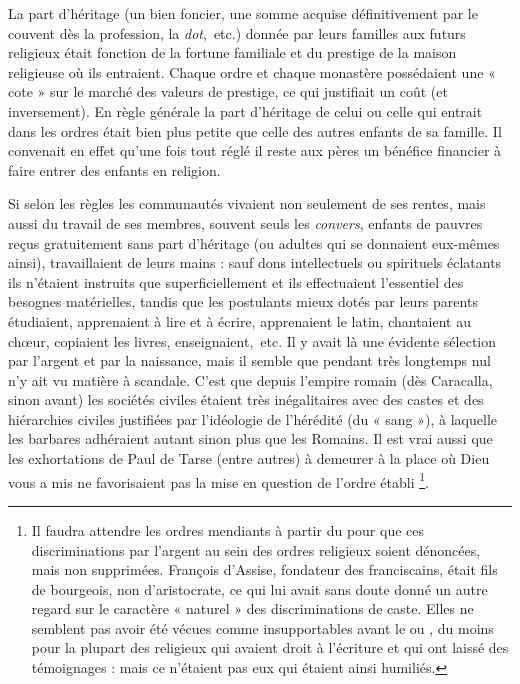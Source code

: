  La part d'héritage (un bien foncier, une somme acquise définitivement par le couvent dès la profession, la \emph{dot},~etc.) donnée par leurs familles aux futurs religieux était fonction de la fortune familiale et du prestige de la maison religieuse où ils entraient. Chaque ordre et chaque monastère possédaient une « cote » sur le marché des valeurs de prestige, ce qui justifiait un coût (et inversement). En règle générale la part d'héritage de celui ou celle qui entrait dans les ordres était bien plus petite que celle des autres enfants de sa famille. Il convenait en effet qu'une fois tout réglé il reste aux pères un bénéfice financier à faire entrer des enfants en religion. 

 Si selon les règles les communautés vivaient non seulement de ses rentes, mais aussi du travail de ses membres, souvent seuls les \emph{convers}, enfants de pauvres reçus gratuitement sans part d'héritage (ou adultes qui se donnaient eux-mêmes ainsi), travaillaient de leurs mains : sauf dons intellectuels ou spirituels éclatants ils n'étaient instruits que superficiellement et ils effectuaient l'essentiel des besognes matérielles, tandis que les postulants mieux dotés par leurs parents étudiaient, apprenaient à lire et à écrire, apprenaient le latin, chantaient au chœur, copiaient les livres, enseignaient,~etc. Il y avait là une évidente sélection par l'argent et par la naissance, mais il semble que pendant très longtemps nul n'y ait vu matière à scandale. C'est que depuis l'empire romain (dès Caracalla, sinon avant) les sociétés civiles étaient très inégalitaires avec des castes et des hiérarchies civiles justifiées par l'idéologie de l'hérédité (du « sang »), à laquelle les barbares adhéraient autant sinon plus que les Romains. Il est vrai aussi que les exhortations de Paul de Tarse (entre autres) à demeurer à la place où Dieu vous a mis ne favorisaient pas la mise en question de l'ordre établi
\footnote{Il faudra attendre les ordres mendiants à partir du  pour que ces discriminations par l'argent au sein des ordres religieux soient dénoncées, mais non supprimées. François d'Assise, fondateur des franciscains, était fils de bourgeois, non d'aristocrate, ce qui lui avait sans doute donné un autre regard sur le caractère « naturel » des discriminations de caste. Elles ne semblent pas avoir été vécues comme insupportables avant le  ou , du moins pour la plupart des religieux qui avaient droit à l'écriture et qui ont laissé des témoignages : mais ce n'étaient pas eux qui étaient ainsi humiliés.}. 
 
